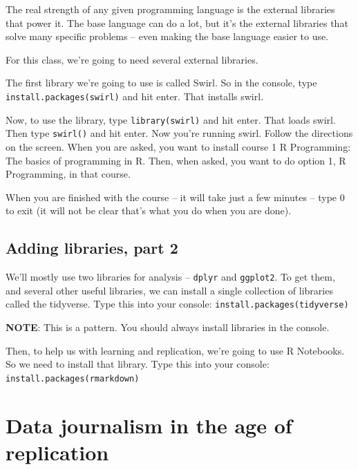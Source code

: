 \documentclass[]{book}
\begin{document}
The real strength of any given programming language is the external libraries that power it. The base language can do a lot, but it's the external libraries that solve many specific problems -- even making the base language easier to use.

For this class, we're going to need several external libraries.

The first library we're going to use is called Swirl. So in the console, type \texttt{install.packages(\textquotesingle{}swirl\textquotesingle{})} and hit enter. That installs swirl.

Now, to use the library, type \texttt{library(swirl)} and hit enter. That loads swirl. Then type \texttt{swirl()} and hit enter. Now you're running swirl. Follow the directions on the screen. When you are asked, you want to install course 1 R Programming: The basics of programming in R. Then, when asked, you want to do option 1, R Programming, in that course.

When you are finished with the course -- it will take just a few minutes -- type 0 to exit (it will not be clear that's what you do when you are done).

\hypertarget{adding-libraries-part-2}{%
\section{Adding libraries, part 2}\label{adding-libraries-part-2}}

We'll mostly use two libraries for analysis -- \texttt{dplyr} and \texttt{ggplot2}. To get them, and several other useful libraries, we can install a single collection of libraries called the tidyverse. Type this into your console: \texttt{install.packages(\textquotesingle{}tidyverse\textquotesingle{})}

\textbf{NOTE}: This is a pattern. You should always install libraries in the console.

Then, to help us with learning and replication, we're going to use R Notebooks. So we need to install that library. Type this into your console: \texttt{install.packages(\textquotesingle{}rmarkdown\textquotesingle{})}

\hypertarget{data-journalism-in-the-age-of-replication}{%
\chapter{Data journalism in the age of replication}\label{data-journalism-in-the-age-of-replication}}
\end{document}
